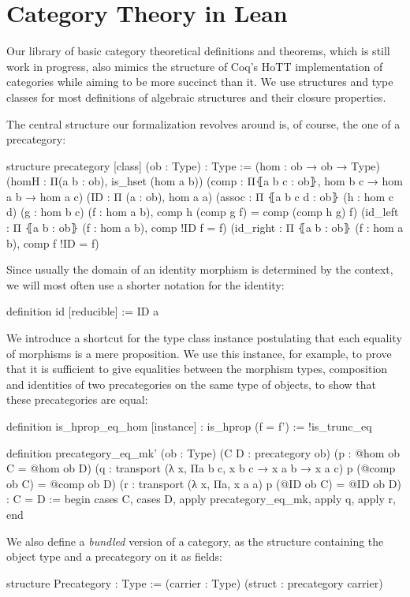 \section{Category Theory in Lean}

Our library of basic category theoretical definitions and theorems, which is
still work in progress, also mimics the structure of Coq's HoTT implementation
of categories while aiming to be more succinct than it.
We use structures and type classes for most definitions of algebraic structures
and their closure properties.

The central structure our formalization revolves around is, of course, the one
of a precategory:
\begin{leancode}
structure precategory [class] (ob : Type) : Type :=
  (hom : ob → ob → Type)
  (homH : Π(a b : ob), is_hset (hom a b))
  (comp : Π⦃a b c : ob⦄, hom b c → hom a b → hom a c)
  (ID : Π (a : ob), hom a a)
  (assoc : Π ⦃a b c d : ob⦄ (h : hom c d) (g : hom b c) (f : hom a b),
     comp h (comp g f) = comp (comp h g) f)
  (id_left : Π ⦃a b : ob⦄ (f : hom a b), comp !ID f = f)
  (id_right : Π ⦃a b : ob⦄ (f : hom a b), comp f !ID = f)
\end{leancode}

Since usually the domain of an identity morphism is determined by the context,
we will most often use a shorter notation for the identity:
\begin{leancode}
definition id [reducible] := ID a
\end{leancode}

We introduce a shortcut for the type class instance postulating that each equality
of morphisms is a mere proposition.
We use this instance, for example, to prove that it is sufficient to give equalities
between the morphism types, composition and identities of two precategories on the
same type of objects, to show that these precategories are equal:

\begin{leancode}
definition is_hprop_eq_hom [instance] : is_hprop (f = f') := !is_trunc_eq

definition precategory_eq_mk' (ob : Type) (C D : precategory ob)
  (p : @hom ob C = @hom ob D)
  (q : transport (λ x, Πa b c, x b c → x a b → x a c) p
    (@comp ob C) = @comp ob D)
  (r : transport (λ x, Πa, x a a) p (@ID ob C) = @ID ob D) : C = D :=
begin
  cases C, cases D,
  apply precategory_eq_mk, apply q, apply r,
end
\end{leancode}

We also define a \emph{bundled} version of a category, as the structure containing
the object type and a precategory on it as fields:
\begin{leancode}
structure Precategory : Type :=
  (carrier : Type)
  (struct : precategory carrier)
\end{leancode}

